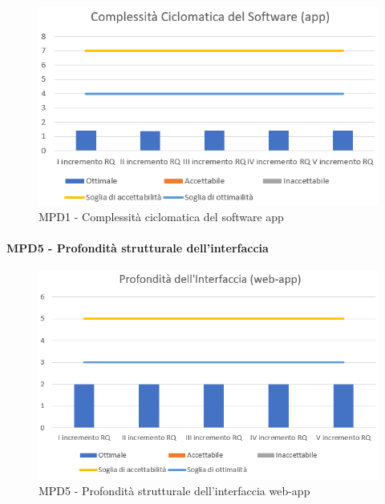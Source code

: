   \begin{figure}[h!]
    \centering
      \includegraphics[scale=1]{Immagini/CicloCompl APP.PNG}
    \caption{MPD1 - Complessità ciclomatica del software app}
  \end{figure}



  \newpage
  \paragraph{MPD5 - Profondità strutturale dell’interfaccia}
  \begin{figure}[h!]
    \centering
      \includegraphics[scale=1]{Immagini/ProfInter WA.PNG}
    \caption{MPD5 - Profondità strutturale dell’interfaccia web-app}
  \end{figure}

